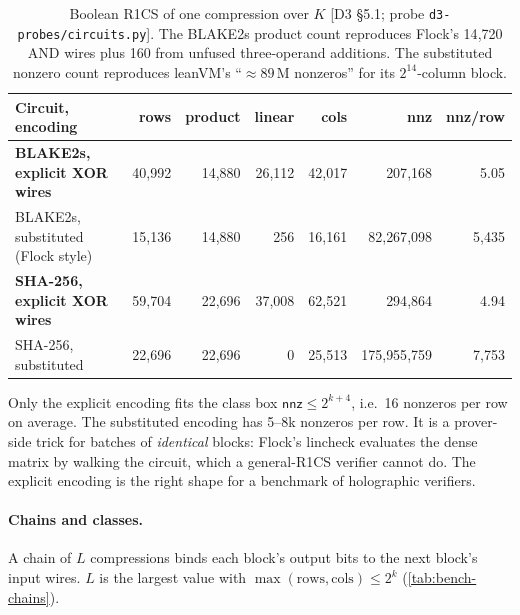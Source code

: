 \begin{table}[t]
\centering\small
\begin{tabular}{@{}lrrrrrr@{}}
\toprule
Circuit, encoding & rows & product & linear & cols & nnz & nnz/row \\
\midrule
\textbf{BLAKE2s, explicit XOR wires} & 40{,}992 & 14{,}880 & 26{,}112 & 42{,}017 & 207{,}168 & 5.05 \\
BLAKE2s, substituted (Flock style) & 15{,}136 & 14{,}880 & 256 & 16{,}161 & 82{,}267{,}098 & 5{,}435 \\
\textbf{SHA-256, explicit XOR wires} & 59{,}704 & 22{,}696 & 37{,}008 & 62{,}521 & 294{,}864 & 4.94 \\
SHA-256, substituted & 22{,}696 & 22{,}696 & 0 & 25{,}513 & 175{,}955{,}759 & 7{,}753 \\
\bottomrule
\end{tabular}
\caption{Boolean R1CS of one compression over $K$ [D3 §5.1; probe \texttt{d3-probes/circuits.py}].
The BLAKE2s product count reproduces Flock's 14{,}720 AND wires plus 160 from unfused three-operand
additions. The substituted nonzero count reproduces leanVM's \enquote{$\approx89$\,M nonzeros} for its
$2^{14}$-column block.}
\label{tab:bench-circuits}
\end{table}

Only the explicit encoding fits the class box $\mathsf{nnz}\le2^{k+4}$, i.e.\ 16 nonzeros per row on
average. The substituted encoding has 5--8k nonzeros per row. It is a prover-side trick for batches
of \emph{identical} blocks: Flock's lincheck evaluates the dense matrix by walking the circuit, which
a general-R1CS verifier cannot do. The explicit encoding is the right shape for a benchmark of
holographic verifiers.

\paragraph{Chains and classes.} A chain of $L$ compressions binds each block's output bits to the
next block's input wires. $L$ is the largest value with $\max(\text{rows},\text{cols})\le2^k$
(\cref{tab:bench-chains}).

